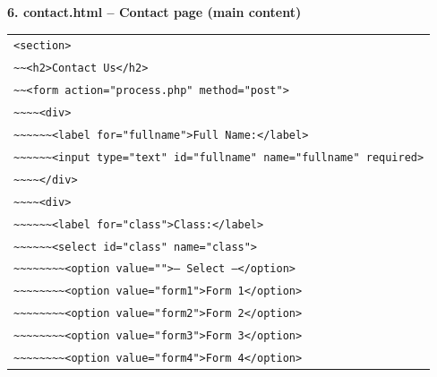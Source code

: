 \documentclass[11pt]{article}
\begin{document}
\textbf{6. contact.html -- Contact page (main content)}
\begin{center}
\begin{tabular}{l}
\texttt{<section>} \\
\texttt{\textasciitilde{}\textasciitilde{}<h2>Contact Us</h2>} \\
\texttt{\textasciitilde{}\textasciitilde{}<form action="process.php" method="post">} \\
\texttt{\textasciitilde{}\textasciitilde{}\textasciitilde{}\textasciitilde{}<div>} \\
\texttt{\textasciitilde{}\textasciitilde{}\textasciitilde{}\textasciitilde{}\textasciitilde{}\textasciitilde{}<label for="fullname">Full Name:</label>} \\
\texttt{\textasciitilde{}\textasciitilde{}\textasciitilde{}\textasciitilde{}\textasciitilde{}\textasciitilde{}<input type="text" id="fullname" name="fullname" required>} \\
\texttt{\textasciitilde{}\textasciitilde{}\textasciitilde{}\textasciitilde{}</div>} \\
\texttt{\textasciitilde{}\textasciitilde{}\textasciitilde{}\textasciitilde{}<div>} \\
\texttt{\textasciitilde{}\textasciitilde{}\textasciitilde{}\textasciitilde{}\textasciitilde{}\textasciitilde{}<label for="class">Class:</label>} \\
\texttt{\textasciitilde{}\textasciitilde{}\textasciitilde{}\textasciitilde{}\textasciitilde{}\textasciitilde{}<select id="class" name="class">} \\
\texttt{\textasciitilde{}\textasciitilde{}\textasciitilde{}\textasciitilde{}\textasciitilde{}\textasciitilde{}\textasciitilde{}\textasciitilde{}<option value="">-- Select --</option>} \\
\texttt{\textasciitilde{}\textasciitilde{}\textasciitilde{}\textasciitilde{}\textasciitilde{}\textasciitilde{}\textasciitilde{}\textasciitilde{}<option value="form1">Form 1</option>} \\
\texttt{\textasciitilde{}\textasciitilde{}\textasciitilde{}\textasciitilde{}\textasciitilde{}\textasciitilde{}\textasciitilde{}\textasciitilde{}<option value="form2">Form 2</option>} \\
\texttt{\textasciitilde{}\textasciitilde{}\textasciitilde{}\textasciitilde{}\textasciitilde{}\textasciitilde{}\textasciitilde{}\textasciitilde{}<option value="form3">Form 3</option>} \\
\texttt{\textasciitilde{}\textasciitilde{}\textasciitilde{}\textasciitilde{}\textasciitilde{}\textasciitilde{}\textasciitilde{}\textasciitilde{}<option value="form4">Form 4</option>} \\

\end{tabular}
\end{center}
\end{document}
